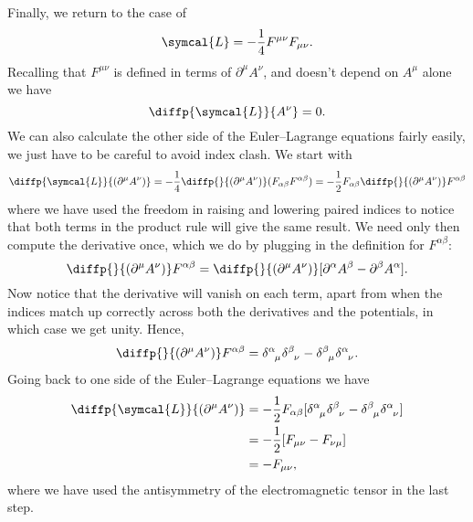 \documentclass[fleqn]{NotesClass}
\newcommand*{\lagrangianDensity}{\symcal{L}}
\begin{document}
    Finally, we return to the case of
    \begin{equation}
        \lagrangianDensity = -\frac{1}{4}F^{\mu\nu}F_{\mu\nu}.
    \end{equation}
    Recalling that \(F^{\mu\nu}\) is defined in terms of \(\partial^\mu A^\nu\), and doesn't depend on \(A^\mu\) alone we have
    \begin{equation}
        \diffp{\lagrangianDensity}{A^\nu} = 0.
    \end{equation}
    We can also calculate the other side of the Euler--Lagrange equations fairly easily, we just have to be careful to avoid index clash.
    We start with
    \begin{equation}
        \diffp{\lagrangianDensity}{(\partial^\mu A^\nu)} = -\frac{1}{4}\diffp{}{(\partial^\mu A^\nu)} (F_{\alpha\beta}F^{\alpha\beta}) = -\frac{1}{2} F_{\alpha\beta} \diffp{}{(\partial^\mu A^\nu)} F^{\alpha\beta}
    \end{equation}
    where we have used the freedom in raising and lowering paired indices to notice that both terms in the product rule will give the same result.
    We need only then compute the derivative once, which we do by plugging in the definition for \(F^{\alpha\beta}\):
    \begin{equation}
        \diffp{}{(\partial^\mu A^\nu)} F^{\alpha\beta} = \diffp{}{(\partial^\mu A^\nu)} [\partial^\alpha A^\beta - \partial^\beta A^\alpha].
    \end{equation}
    Now notice that the derivative will vanish on each term, apart from when the indices match up correctly across both the derivatives and the potentials, in which case we get unity.
    Hence,
    \begin{equation}
        \diffp{}{(\partial^\mu A^\nu)} F^{\alpha\beta} = \tensor{\delta}{^\alpha_\mu} \tensor{\delta}{^\beta_\nu} - \tensor{\delta}{^\beta_\mu} \tensor{\delta}{^\alpha_\nu}.
    \end{equation}
    Going back to one side of the Euler--Lagrange equations we have
    \begin{align}
        \diffp{\lagrangianDensity}{(\partial^\mu A^\nu)} &= -\frac{1}{2}F_{\alpha\beta}[\tensor{\delta}{^\alpha_\mu}\tensor{\delta}{^\beta_\nu} - \tensor{\delta}{^\beta_\mu} \tensor{\delta}{^\alpha_\nu}]\\
        &= -\frac{1}{2}[F_{\mu\nu} - F_{\nu\mu}]\\
        &= -F_{\mu\nu},
    \end{align}
    where we have used the antisymmetry of the electromagnetic tensor in the last step.
    
\end{document}
